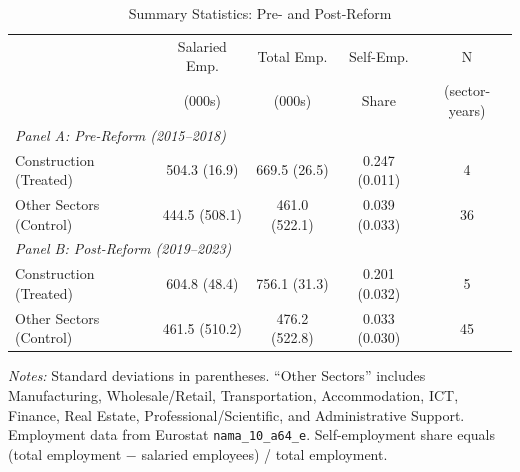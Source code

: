 \begin{table}[htbp]
\centering
\caption{Summary Statistics: Pre- and Post-Reform}
\label{tab:summary}
\begin{threeparttable}
\begin{tabular}{lcccc}
\toprule
 & Salaried Emp. & Total Emp. & Self-Emp. & N \\
 & (000s) & (000s) & Share & (sector-years) \\
\midrule
\multicolumn{5}{l}{\textit{Panel A: Pre-Reform (2015--2018)}} \\
Construction (Treated) & 504.3 (16.9) & 669.5 (26.5) & 0.247 (0.011) & 4 \\
Other Sectors (Control) & 444.5 (508.1) & 461.0 (522.1) & 0.039 (0.033) & 36 \\
\midrule
\multicolumn{5}{l}{\textit{Panel B: Post-Reform (2019--2023)}} \\
Construction (Treated) & 604.8 (48.4) & 756.1 (31.3) & 0.201 (0.032) & 5 \\
Other Sectors (Control) & 461.5 (510.2) & 476.2 (522.8) & 0.033 (0.030) & 45 \\
\bottomrule
\end{tabular}
\begin{tablenotes}[flushleft]
\small
\item \textit{Notes:} Standard deviations in parentheses. ``Other Sectors'' includes Manufacturing, Wholesale/Retail, Transportation, Accommodation, ICT, Finance, Real Estate, Professional/Scientific, and Administrative Support. Employment data from Eurostat \texttt{nama\_10\_a64\_e}. Self-employment share equals (total employment $-$ salaried employees) / total employment.
\end{tablenotes}
\end{threeparttable}
\end{table}
